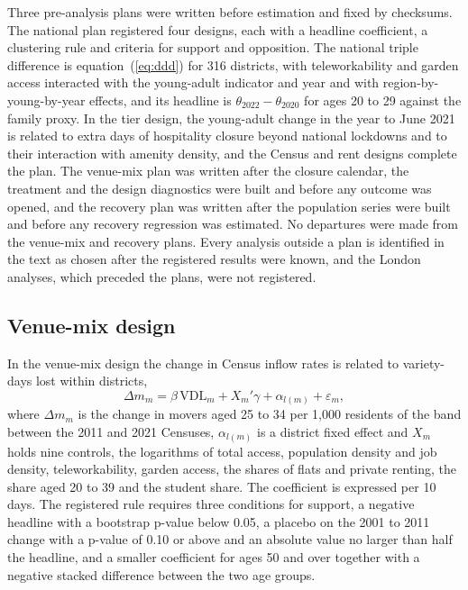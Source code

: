 \documentclass[11pt,a4paper]{article}
\begin{document}
Three pre-analysis plans were written before estimation and fixed by checksums. The national plan registered four designs, each with a headline coefficient, a clustering rule and criteria for support and opposition. The national triple difference is equation~(\ref{eq:ddd}) for 316 districts, with teleworkability and garden access interacted with the young-adult indicator and year and with region-by-young-by-year effects, and its headline is $\theta_{2022} - \theta_{2020}$ for ages 20 to 29 against the family proxy. In the tier design, the young-adult change in the year to June 2021 is related to extra days of hospitality closure beyond national lockdowns and to their interaction with amenity density, and the Census and rent designs complete the plan. The venue-mix plan was written after the closure calendar, the treatment and the design diagnostics were built and before any outcome was opened, and the recovery plan was written after the population series were built and before any recovery regression was estimated. No departures were made from the venue-mix and recovery plans. Every analysis outside a plan is identified in the text as chosen after the registered results were known, and the London analyses, which preceded the plans, were not registered.

\subsection{Venue-mix design}

In the venue-mix design the change in Census inflow rates is related to variety-days lost within districts,
\begin{equation}\label{eq:vm}
\Delta m_m = \beta \, \mathrm{VDL}_m + X_m' \gamma + \alpha_{l(m)} + \varepsilon_m,
\end{equation}
where $\Delta m_m$ is the change in movers aged 25 to 34 per 1,000 residents of the band between the 2011 and 2021 Censuses, $\alpha_{l(m)}$ is a district fixed effect and $X_m$ holds nine controls, the logarithms of total access, population density and job density, teleworkability, garden access, the shares of flats and private renting, the share aged 20 to 39 and the student share. The coefficient is expressed per 10 days. The registered rule requires three conditions for support, a negative headline with a bootstrap p-value below 0.05, a placebo on the 2001 to 2011 change with a p-value of 0.10 or above and an absolute value no larger than half the headline, and a smaller coefficient for ages 50 and over together with a negative stacked difference between the two age groups.
\end{document}
